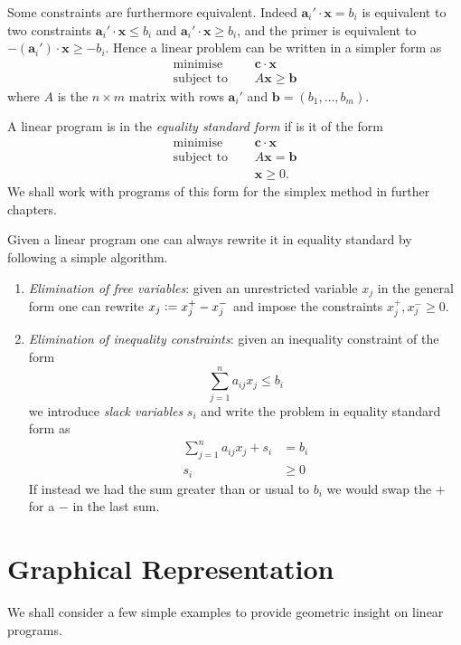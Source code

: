 \documentclass[main.tex]{subfiles}
\begin{document}
        \begin{remark}
                Some constraints are furthermore equivalent. Indeed $\mathbf{a}_{i}'\cdot \mathbf{x} = b_{i}$ is equivalent to two constraints $\mathbf{a}_{i}' \cdot \mathbf{x} \le b_{i}$ and $\mathbf{a}_{i}' \cdot \mathbf{x} \ge b_{i}$, and the primer is equivalent to $-(\mathbf{a}_{i}')\cdot\mathbf{x} \ge -b_{i}$. Hence a linear problem can be written in a simpler form as
                \begin{align}
                        \text{minimise} \quad & \mathbf{c}\cdot \mathbf{x} \\
                        \text{subject to } \quad & A\mathbf{x} \ge \mathbf{b}
                \end{align} where $A$ is the $n \times m$ matrix with rows $\mathbf{a}_{i}'$ and $\mathbf{b} = (b_1, \ldots, b_{m})$.
        \end{remark}

        \begin{definition}
                A linear program is in the \emph{equality standard form} if is it of the form
                \begin{align*}
                        \text{minimise} \quad & \mathbf{c}\cdot \mathbf{x} \\
                        \text{subject to } \quad & A\mathbf{x} = \mathbf{b} \\
                        & \mathbf{x} \ge 0
                .\end{align*}
                We shall work with programs of this form for the simplex method in further chapters.
        \end{definition}

        Given a linear program one can always rewrite it in equality standard by following a simple algorithm.

        \begin{enumerate}
                \item \emph{Elimination of free variables}: given an unrestricted variable $x_{j}$ in the general form one can rewrite $x_{j} \vcentcolon= x_{j}^{+} - x_{j}^{-}$ and impose the constraints $x_{j}^{+}, x_{j}^{-}\ge 0$.
                \item \emph{Elimination of inequality constraints}: given an inequality constraint of the form \[\sum_{j=1}^{n} a_{ij}x_{j} \le b_{i}\] we introduce \emph{slack variables} $s_{i}$ and write the problem in equality standard form as 
                        \begin{align*}
                                \sum_{j=1}^{n} a_{ij}x_{j} + s_{i} &= b_{i} \\ 
                                s_{i} &\ge 0
                        \end{align*}
               If instead we had the sum greater than or usual to $b_{i}$ we would swap the $+$ for a $-$ in the last sum.
        \end{enumerate}

        \section{Graphical Representation}
        We shall consider a few simple examples to provide geometric insight on linear programs.
        
\end{document}
